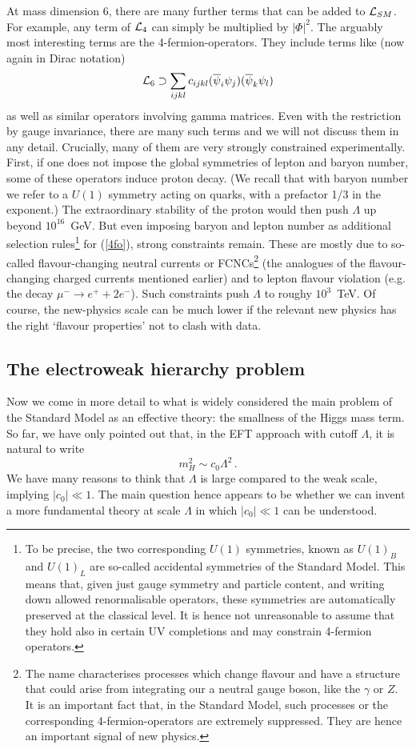 \documentclass[12pt]{article}
\newcommand{\be}{\begin{equation}}
\newcommand{\ee}{\end{equation}}
\newcommand{\ol}{\overline}
\numberwithin{equation}{section}
\begin{document}
At mass dimension 6, there are many further terms that can be added to ${\cal L}_{SM}$. For example, any term of ${\cal L}_4$ can simply be multiplied by $|\Phi|^2$. The arguably most interesting terms are the 4-fermion-operators. They include terms like (now again in Dirac notation)
\be
{\cal L}_6\supset \sum_{ijkl}c_{ijkl}(\ol{\psi}_i\psi_j)(\ol{\psi}_k\psi_l)
\label{4fo}
\ee
as well as similar operators involving gamma matrices. Even with the restriction by gauge invariance, there are many such terms and we will not discuss them in any detail. Crucially, many of them are very strongly constrained experimentally. First, if one does not impose the global symmetries of lepton and baryon number, some of these operators induce proton decay. (We recall that with baryon number we refer to a $U(1)$ symmetry acting on quarks, with a prefactor 1/3 in the exponent.) The extraordinary stability of the proton would then push $\Lambda$ up beyond $10^{16}$~GeV. But even imposing baryon and lepton number as additional selection rules\footnote{
To 
be precise, the two corresponding $U(1)$ symmetries, known as $U(1)_B$ and $U(1)_L$ are so-called accidental symmetries of the Standard Model. This means that, given just gauge symmetry and particle content, and writing down allowed renormalisable operators, these symmetries are automatically preserved at the classical level. It is hence not unreasonable to assume that they hold also in certain UV completions and may constrain 4-fermion operators.
} 
for (\ref{4fo}), strong constraints remain. These are mostly due to so-called flavour-changing neutral currents or FCNCs\footnote{
The name characterises processes which change flavour and have a structure that could arise from integrating our a neutral gauge boson, like the $\gamma$ or $Z$. It is an important fact that, in the Standard Model, such processes or the corresponding 4-fermion-operators are extremely suppressed. They are hence an important signal of new physics.
} 
(the analogues of the flavour-changing charged currents mentioned earlier) and to lepton flavour violation (e.g. the decay $\mu^-\to e^++2e^-$). Such constraints push $\Lambda$ to roughy $10^3$~TeV. Of course, the new-physics scale can be much lower if the relevant new physics has the right `flavour properties' not to clash with data.






\subsection{The electroweak hierarchy problem}
 
Now we come in more detail to what is widely considered the main problem of the Standard Model as an effective theory: the smallness of the Higgs mass term. So far, we have only pointed out that, in the EFT approach with cutoff $\Lambda$, it is natural to write
\be
m_H^2\sim c_0\Lambda^2\,.
\ee
We have many reasons to think that $\Lambda$ is large compared to the weak scale, implying $|c_0|\ll 1$. The main question hence appears to be whether we can invent a more fundamental theory at scale $\Lambda$ in which $|c_0|\ll 1$ can be understood.
\end{document}
